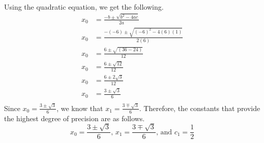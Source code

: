 \documentclass{article}
\begin{document}
Using the quadratic equation, we get the following.
\[
\begin{split}
    x_0 &= \frac{-b\pm \sqrt{b^2-4ac}}{2a} \\
    x_0 &= \frac{-(-6)\pm \sqrt{(-6)^2-4(6)(1)}}{2(6)} \\
    x_0 &= \frac{6\pm \sqrt{(36-24)}}{12} \\
    x_0 &= \frac{6\pm \sqrt{12}}{12} \\
    x_0 &= \frac{6\pm 2\sqrt{3}}{12} \\
    x_0 &= \frac{3\pm \sqrt{3}}{6} \\
\end{split}
\]
Since \(x_0 = \frac{3\pm \sqrt{3}}{6}\), we know that \(x_1 = \frac{3\mp \sqrt{3}}{6}\). Therefore, the constants that provide the highest degree of precision are as follows.
\[
x_0 = \frac{3\pm \sqrt{3}}{6}\mbox{, } x_1 = \frac{3\mp \sqrt{3}}{6}\mbox{, and } c_1 = \frac{1}{2}
\]
\end{document}
